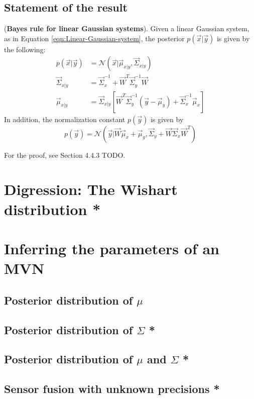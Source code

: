 \subsection{Statement of the result}
\begin{theorem}(\textbf{Bayes rule for linear Gaussian systems}). 
Given a linear Gaussian system, as in Equation \ref{eqn:Linear-Gaussian-system}, the posterior $p(\vec{x}|\vec{y})$ is given by the following:
\begin{equation}\label{eqn:Linear-Gaussian-system-posterior}
  \boxed{\begin{split}
    p(\vec{x}|\vec{y})&=\mathcal{N}(\vec{x}|\vec{\mu}_{x|y},\vec{\Sigma}_{x|y}) \\
	\vec{\Sigma}_{x|y}&=\vec{\Sigma}_x^{-1}+\vec{W}^T\vec{\Sigma}_y^{-1}\vec{W} \\
	\vec{\mu}_{x|y}&=\vec{\Sigma}_{x|y}\left[\vec{W}^T\vec{\Sigma}_y^{-1}(\vec{y}-\vec{\mu}_y)+\vec{\Sigma}_x^{-1}\vec{\mu}_x\right]
  \end{split}}
\end{equation}
In addition, the normalization constant $p(\vec{y})$ is given by
\begin{equation}\label{eqn:Linear-Gaussian-system-normalizer}
  \boxed{
    p(\vec{y})=\mathcal{N}(\vec{y}|\vec{W}\vec{\mu}_x+\vec{\mu}_y,\vec{\Sigma}_y+\vec{W}\vec{\Sigma}_x\vec{W}^T)
  }
\end{equation}
\end{theorem}

For the proof, see Section 4.4.3 TODO.


\section{Digression: The Wishart distribution *}


\section{Inferring the parameters of an MVN}


\subsection{Posterior distribution of $\mu$}



\subsection{Posterior distribution of $\Sigma$ *}



\subsection{Posterior distribution of $\mu$ and $\Sigma$ *}
\label{sec:Posterior-distribution-of-mu-and-Sigma}


\subsection{Sensor fusion with unknown precisions *}

